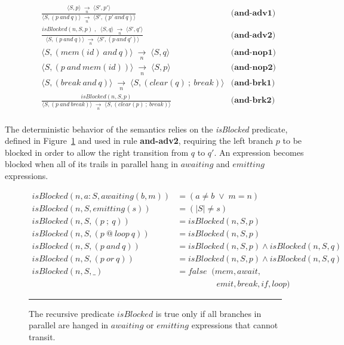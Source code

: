 \documentclass{sigplanconf}
\newcommand{\ST}{\1\xrightarrow[~n~]{}\1}
\newcommand{\LL}{\langle}
\newcommand{\RR}{\rangle}
\newcommand{\DS}{\displaystyle}
\newcommand{\1}{\;}
\newcommand{\2}{\;\;}
\newcommand{\3}{\;\;\;}
\newcommand{\5}{\;\;\;\;\;}
\begin{document}
{ \setlength{\jot}{20pt}
\begin{eqnarray*}
& \frac
    {\DS \LL S,p \RR \ST \LL S',p' \RR }
    {\DS \LL S, (p~and~q) \RR \ST \LL S', (p'~and~q) \RR }
    & \textbf{(and-adv1)}      \\
& \frac
    {\DS isBlocked(n,S,p) \1,\2 \LL S,q \RR \ST \LL S',q' \RR }
    {\DS \LL S, (p~and~q) \RR \ST \LL S', (p~and~q') \RR }
    & \textbf{(and-adv2)}      \\
& \LL S, (mem(id)~and~q) \RR \ST \LL S, q \RR
    & \textbf{(and-nop1)}   \\
& \LL S, (p~and~mem(id)) \RR \ST \LL S, p \RR
    & \textbf{(and-nop2)}   \\
& \LL S, (break~and~q) \RR \ST \LL S, (clear(q)~;~break) \RR
    & \textbf{(and-brk1)}   \\
& \frac
    {\DS isBlocked(n,S,p) }
    {\DS \LL S, (p~and~break) \RR \ST \LL S, (clear(p)~;~break) \RR }
    & \textbf{(and-brk2)}   \\
\end{eqnarray*}
}

The deterministic behavior of the semantics relies on the \emph{isBlocked} 
predicate, defined in Figure~\ref{fig.isBlocked} and used in rule 
\textbf{and-adv2}, requiring the left branch $p$ to be blocked in order to 
allow the right transition from $q$ to $q'$.
%
An expression becomes blocked when all of its trails in parallel hang in 
$awaiting$ and $emitting$ expressions.

\begin{figure}[t]
{\small
\begin{align*}
  isBlocked(n,a:S, awaiting(b,m)) &= (a \neq b \1\vee\1 m = n)   \\
  isBlocked(n,S, emitting(s))    &= (|S| \neq s)                     \\
  isBlocked(n,S, (p~;~q))        &= isBlocked(n,S,p)             \\
  isBlocked(n,S, (p~@~loop~q))   &= isBlocked(n,S,p)             \\
  isBlocked(n,S, (p~and~q))      &= isBlocked(n,S,p) \wedge
                                    isBlocked(n,S,q)             \\
  isBlocked(n,S, (p~or~q))       &= isBlocked(n,S,p) \wedge
                                    isBlocked(n,S,q)             \\
  isBlocked(n,S, \_)             &= false \2  (mem,await,      \\
                                  &    \5\5\5\2 emit,break,if,loop)   %
\end{align*}
}%
\rule{14cm}{0.37pt}
\caption{
The recursive predicate $isBlocked$ is true only if all branches in parallel 
are hanged in $awaiting$ or $emitting$ expressions that cannot transit.
\label{fig.isBlocked}
}
\end{figure}
\end{document}
